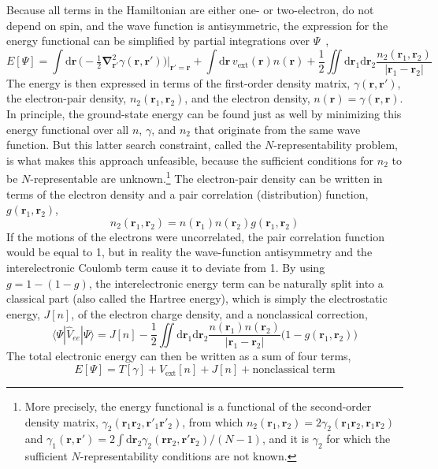 Because all terms in the Hamiltonian are either one- or two-electron, do not depend on spin, and the wave function is antisymmetric, the expression for the energy functional can be simplified by partial integrations over $\Psi$~\cite{Parr89},
\begin{equation}
  E[\Psi]=\int\mathrm d\mathbf r\,\big(-\tfrac12\boldsymbol\nabla_{\mathbf r'}^2 \gamma(\mathbf r,\mathbf r')\!\big)\big|_{\mathbf r'=\mathbf r}+\int\mathrm d\mathbf r\,v_\text{ext}(\mathbf r)n(\mathbf r)+\frac12\iint\mathrm d\mathbf r_1\mathrm d\mathbf r_2\frac{n_2(\mathbf r_1,\mathbf r_2)}{|\mathbf r_1-\mathbf r_2|}
  \label{eq:master-energy-functional}
\end{equation}
The energy is then expressed in terms of the first-order density matrix, $\gamma(\mathbf r,\mathbf r')$, the electron-pair density, $n_2(\mathbf r_1,\mathbf r_2)$, and the electron density, $n(\mathbf r)=\gamma(\mathbf r,\mathbf r)$.
In principle, the ground-state energy can be found just as well by minimizing this energy functional over all $n$, $\gamma$, and $n_2$ that originate from the same wave function.
But this latter search constraint, called the $N$-representability problem, is what makes this approach unfeasible, because the sufficient conditions for $n_2$ to be $N$-representable are unknown.\footnote{
More precisely, the energy functional is a functional of the second-order density matrix, $\gamma_2(\mathbf r_1\mathbf r_2,\mathbf r'_1\mathbf r'_2)$, from which $n_2(\mathbf r_1,\mathbf r_2)=2\gamma_2(\mathbf r_1\mathbf r_2,\mathbf r_1\mathbf r_2)$ and $\gamma_1(\mathbf r,\mathbf r')=2\int\mathrm d\mathbf r_2\gamma_2(\mathbf r\mathbf r_2,\mathbf r'\mathbf r_2)/(N-1)$, and it is $\gamma_2$ for which the sufficient $N$-representability conditions are not known.
}
The electron-pair density can be written in terms of the electron density and a pair correlation (distribution) function, $g(\mathbf r_1,\mathbf r_2)$,
\begin{equation}
  n_2(\mathbf r_1,\mathbf r_2)=n(\mathbf r_1)n(\mathbf r_2)g(\mathbf r_1,\mathbf r_2)
\end{equation}
If the motions of the electrons were uncorrelated, the pair correlation function would be equal to 1, but in reality the wave-function antisymmetry and the interelectronic Coulomb term cause it to deviate from 1.
By using $g=1-(1-g)$, the interelectronic energy term can be naturally split into a classical part (also called the Hartree energy), which is simply the electrostatic energy, $J[n]$, of the electron charge density, and a nonclassical correction,
\begin{equation}
  \langle\Psi|\hat V_{ee}|\Psi\rangle=J[n]-
  \frac12\iint\mathrm d\mathbf r_1\mathrm d\mathbf r_2\frac{n(\mathbf r_1)n(\mathbf r_2)}{|\mathbf r_1-\mathbf r_2|}\big(1-g(\mathbf r_1,\mathbf r_2)\!\big)
\end{equation}
The total electronic energy can then be written as a sum of four terms,
\begin{equation}
  E[\Psi]=T[\gamma]+V_\text{ext}[n]+J[n]+\text{nonclassical term}
  \label{eq:energy-nonclassical}
\end{equation}

